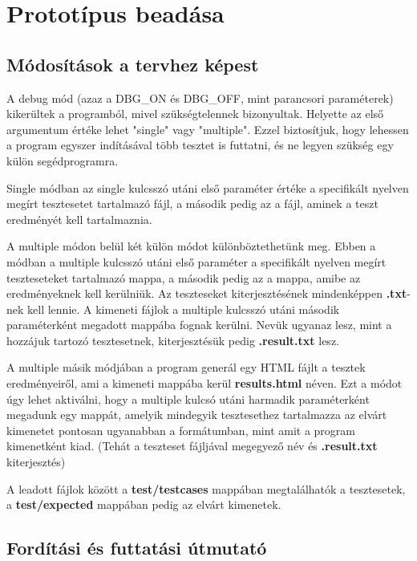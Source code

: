 %
\chapter{Prototípus beadása}

\thispagestyle{fancy}

\section{Módosítások a tervhez képest}

A debug mód (azaz a DBG\_ON és DBG\_OFF, mint parancsori paraméterek) kikerültek a programból, mivel szükségtelennek bizonyultak. Helyette az első argumentum értéke lehet "single" vagy "multiple". Ezzel biztosítjuk, hogy lehessen a program egyszer indításával több tesztet is futtatni, és ne legyen szükség egy külön segédprogramra.\par
Single módban az single kulcsszó utáni első paraméter értéke a specifikált nyelven megírt tesztesetet tartalmazó fájl, a második pedig az a fájl, aminek a teszt eredményét kell tartalmaznia.\par
A multiple módon belül két külön módot különböztethetünk meg. Ebben a módban a multiple kulcsszó utáni első paraméter a specifikált nyelven megírt teszteseteket tartalmazó mappa, a második pedig az a mappa, amibe az eredményeknek kell kerülniük. Az teszteseket kiterjesztésének mindenképpen \textbf{.txt}-nek kell lennie. A kimeneti fájlok a multiple kulcsszó utáni második paraméterként megadott mappába fognak kerülni. Nevük ugyanaz lesz, mint a hozzájuk tartozó tesztesetnek, kiterjesztésük pedig \textbf{.result.txt} lesz.\par
A multiple másik módjában a program generál egy HTML fájlt a tesztek eredményeiről, ami a kimeneti mappába kerül \textbf{results.html} néven. Ezt a módot úgy lehet aktiválni, hogy a multiple kulcsó utáni harmadik paraméterként megadunk egy mappát, amelyik mindegyik tesztesethez tartalmazza az elvárt kimenetet pontosan ugyanabban a formátumban, mint amit a program kimenetként kiad. (Tehát a teszteset fájljával megegyező név és \textbf{.result.txt} kiterjesztés)\par
\par
A leadott fájlok között a \textbf{test/testcases} mappában megtalálhatók a tesztesetek, a \textbf{test/expected} mappában pedig az elvárt kimenetek.

\section{Fordítási és futtatási útmutató}

